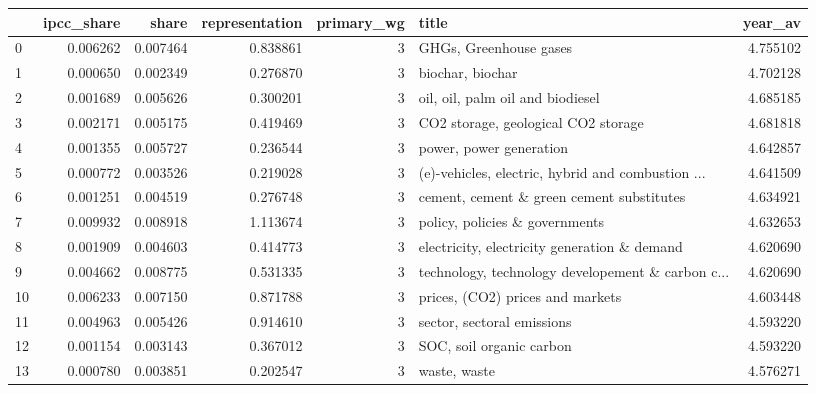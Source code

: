 \begin{tabular}{lrrrrlr}
\toprule
{} &  ipcc\_share &     share &  representation &  primary\_wg &                                              title &   year\_av \\
\midrule
0   &    0.006262 &  0.007464 &        0.838861 &           3 &                             GHGs, Greenhouse gases &  4.755102 \\
1   &    0.000650 &  0.002349 &        0.276870 &           3 &                                   biochar, biochar &  4.702128 \\
2   &    0.001689 &  0.005626 &        0.300201 &           3 &                   oil, oil, palm oil and biodiesel &  4.685185 \\
3   &    0.002171 &  0.005175 &        0.419469 &           3 &                CO2 storage, geological CO2 storage &  4.681818 \\
4   &    0.001355 &  0.005727 &        0.236544 &           3 &                            power, power generation &  4.642857 \\
5   &    0.000772 &  0.003526 &        0.219028 &           3 &  (e)-vehicles, electric, hybrid and combustion ... &  4.641509 \\
6   &    0.001251 &  0.004519 &        0.276748 &           3 &          cement, cement \& green cement substitutes &  4.634921 \\
7   &    0.009932 &  0.008918 &        1.113674 &           3 &                     policy, policies \& governments &  4.632653 \\
8   &    0.001909 &  0.004603 &        0.414773 &           3 &       electricity, electricity generation \& demand &  4.620690 \\
9   &    0.004662 &  0.008775 &        0.531335 &           3 &  technology, technology developement \& carbon c... &  4.620690 \\
10  &    0.006233 &  0.007150 &        0.871788 &           3 &                   prices, (CO2) prices and markets &  4.603448 \\
11  &    0.004963 &  0.005426 &        0.914610 &           3 &                         sector, sectoral emissions &  4.593220 \\
12  &    0.001154 &  0.003143 &        0.367012 &           3 &                           SOC, soil organic carbon &  4.593220 \\
13  &    0.000780 &  0.003851 &        0.202547 &           3 &                                       waste, waste &  4.576271 \\

\end{tabular}

